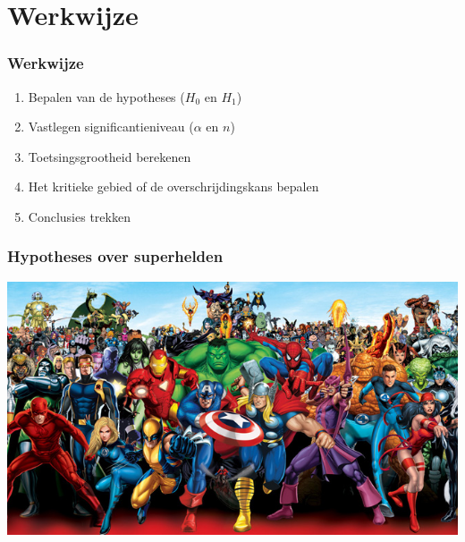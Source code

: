 \documentclass{beamer}
\begin{document}
\section{Werkwijze}
\sectionframelogo{}

\begin{frame}
  \frametitle{Werkwijze}

  \begin{enumerate}
    \item Bepalen van de hypotheses ($H_0$ en $H_1$)
    \item Vastlegen significantieniveau ($\alpha$ en $n$)
    \item Toetsingsgrootheid berekenen
    \item Het kritieke gebied of de overschrijdingskans bepalen
    \item Conclusies trekken
  \end{enumerate}
\end{frame}

\begin{frame}
  \frametitle{Hypotheses over superhelden}

  \includegraphics[width=\textwidth]{img/les5-heroes}
\end{frame}
\end{document}
